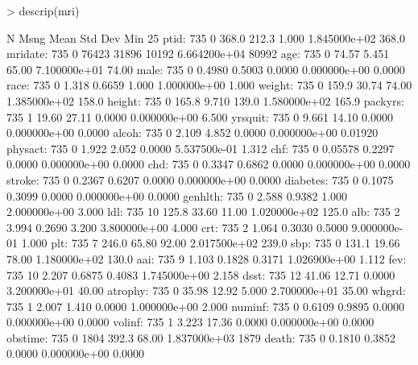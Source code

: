 \documentclass{article}
\begin{document}
\begin{Schunk}
\begin{Sinput}
> descrip(mri)
\end{Sinput}
\begin{Soutput}
            N     Msng  Mean      Std Dev    Min       25%
    ptid:     735     0   368.0     212.3     1.000   1.845000e+02   368.0  
 mridate:     735     0   76423     31896     10192   6.664200e+04   80992  
     age:     735     0   74.57     5.451     65.00   7.100000e+01   74.00  
    male:     735     0   0.4980    0.5003    0.0000  0.000000e+00   0.0000 
    race:     735     0   1.318     0.6659    1.000   1.000000e+00   1.000  
  weight:     735     0   159.9     30.74     74.00   1.385000e+02   158.0  
  height:     735     0   165.8     9.710     139.0   1.580000e+02   165.9  
 packyrs:     735     1   19.60     27.11     0.0000  0.000000e+00   6.500  
 yrsquit:     735     0   9.661     14.10     0.0000  0.000000e+00   0.0000 
   alcoh:     735     0   2.109     4.852     0.0000  0.000000e+00  0.01920 
 physact:     735     0   1.922     2.052     0.0000  5.537500e-01   1.312  
     chf:     735     0  0.05578    0.2297    0.0000  0.000000e+00   0.0000 
     chd:     735     0   0.3347    0.6862    0.0000  0.000000e+00   0.0000 
  stroke:     735     0   0.2367    0.6207    0.0000  0.000000e+00   0.0000 
diabetes:     735     0   0.1075    0.3099    0.0000  0.000000e+00   0.0000 
 genhlth:     735     0   2.588     0.9382    1.000   2.000000e+00   3.000  
     ldl:     735    10   125.8     33.60     11.00   1.020000e+02   125.0  
     alb:     735     2   3.994     0.2690    3.200   3.800000e+00   4.000  
     crt:     735     2   1.064     0.3030    0.5000  9.000000e-01   1.000  
     plt:     735     7   246.0     65.80     92.00   2.017500e+02   239.0  
     sbp:     735     0   131.1     19.66     78.00   1.180000e+02   130.0  
     aai:     735     9   1.103     0.1828    0.3171  1.026900e+00   1.112  
     fev:     735    10   2.207     0.6875    0.4083  1.745000e+00   2.158  
    dsst:     735    12   41.06     12.71     0.0000  3.200000e+01   40.00  
 atrophy:     735     0   35.98     12.92     5.000   2.700000e+01   35.00  
   whgrd:     735     1   2.007     1.410     0.0000  1.000000e+00   2.000  
  numinf:     735     0   0.6109    0.9895    0.0000  0.000000e+00   0.0000 
  volinf:     735     1   3.223     17.36     0.0000  0.000000e+00   0.0000 
 obstime:     735     0    1804     392.3     68.00   1.837000e+03    1879  
   death:     735     0   0.1810    0.3852    0.0000  0.000000e+00   0.0000 

\end{Soutput}
\end{Schunk}
\end{document}
